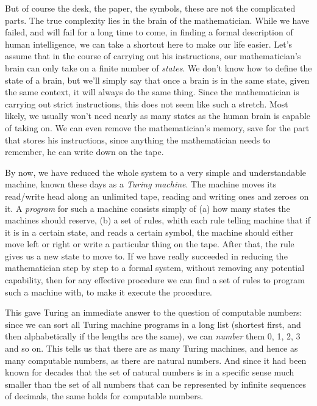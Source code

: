 But of course the desk, the paper, the symbols, these are not the complicated parts. The true complexity lies in the brain of the mathematician. While we have failed, and will fail for a long time to come, in finding a formal description of human intelligence, we can take a shortcut here to make our life easier. Let's assume that in the course of carrying out his instructions, our mathematician's brain can only take on a finite number of \emph{states}. We don't know how to define the state of a brain, but we'll simply say that once a brain is in the same state, given the same context, it will always do the same thing. Since the mathematician is carrying out strict instructions, this does not seem like such a stretch. Most likely, we usually won't need nearly as many states as the human brain is capable of taking on. We can even remove the mathematician's memory, save for the part that stores his instructions, since anything the mathematician needs to remember, he can write down on the tape.

By now, we have reduced the whole system to a very simple and understandable machine, known these days as a \emph{Turing machine}. The machine moves its read/write head along an unlimited tape, reading and writing ones and zeroes on it. A \emph{program} for such a machine consists simply of (a) how many states the machines should reserve, (b) a set of rules, whith each rule telling machine that if it is in a certain state, and reads a certain symbol, the machine should either move left or right or write a particular thing on the tape. After that, the rule gives us a new state to move to. If we have really succeeded in reducing the mathematician step by step to a formal system, without removing any potential capability, then for any effective procedure we can find a set of rules to program such a machine with, to make it execute the procedure.

This gave Turing an immediate answer to the question of computable numbers: since we can sort all Turing machine programs in a long list (shortest first, and then alphabetically if the lengths are the same), we can \emph{number} them 0, 1, 2, 3 and so on. This tells us that there are as many Turing machines, and hence as many computable numbers, as there are natural numbers. And since it had been known for decades that the set of natural numbers is in a specific sense much smaller than the set of all numbers that can be represented by infinite sequences of decimals, the same holds for computable numbers. 

